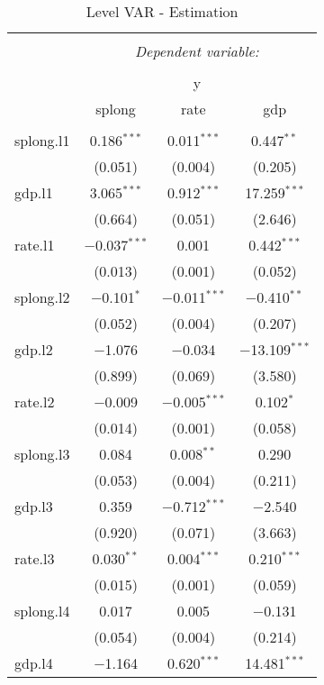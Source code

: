 
\begin{table}[!htbp] \centering 
  \caption{Level VAR - Estimation} 
  \label{tab:est_var_level} 
\small 
\begin{tabular}{@{\extracolsep{5pt}}lccc} 
\\[-1.8ex]\hline 
\hline \\[-1.8ex] 
 & \multicolumn{3}{c}{\textit{Dependent variable:}} \\ 
\cline{2-4} 
\\[-1.8ex] & \multicolumn{3}{c}{y} \\ 
 & splong & rate & gdp \\ 
\hline \\[-1.8ex] 
 splong.l1 & 0.186$^{***}$ & 0.011$^{***}$ & 0.447$^{**}$ \\ 
  & (0.051) & (0.004) & (0.205) \\ 
  gdp.l1 & 3.065$^{***}$ & 0.912$^{***}$ & 17.259$^{***}$ \\ 
  & (0.664) & (0.051) & (2.646) \\ 
  rate.l1 & $-$0.037$^{***}$ & 0.001 & 0.442$^{***}$ \\ 
  & (0.013) & (0.001) & (0.052) \\ 
  splong.l2 & $-$0.101$^{*}$ & $-$0.011$^{***}$ & $-$0.410$^{**}$ \\ 
  & (0.052) & (0.004) & (0.207) \\ 
  gdp.l2 & $-$1.076 & $-$0.034 & $-$13.109$^{***}$ \\ 
  & (0.899) & (0.069) & (3.580) \\ 
  rate.l2 & $-$0.009 & $-$0.005$^{***}$ & 0.102$^{*}$ \\ 
  & (0.014) & (0.001) & (0.058) \\ 
  splong.l3 & 0.084 & 0.008$^{**}$ & 0.290 \\ 
  & (0.053) & (0.004) & (0.211) \\ 
  gdp.l3 & 0.359 & $-$0.712$^{***}$ & $-$2.540 \\ 
  & (0.920) & (0.071) & (3.663) \\ 
  rate.l3 & 0.030$^{**}$ & 0.004$^{***}$ & 0.210$^{***}$ \\ 
  & (0.015) & (0.001) & (0.059) \\ 
  splong.l4 & 0.017 & 0.005 & $-$0.131 \\ 
  & (0.054) & (0.004) & (0.214) \\ 
  gdp.l4 & $-$1.164 & 0.620$^{***}$ & 14.481$^{***}$ \\ 

\end{tabular}
\end{table}
